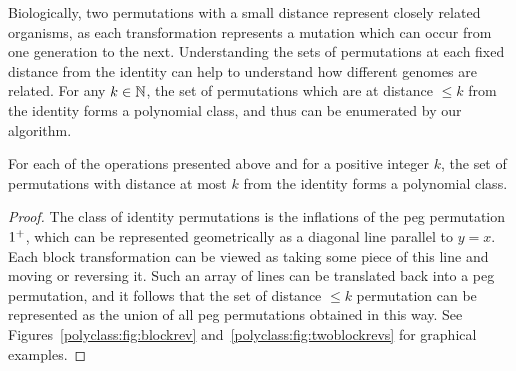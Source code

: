     Biologically, two permutations with a small distance represent closely
    related organisms, as each transformation represents a mutation which can
    occur from one generation to the next. Understanding the sets of
    permutations at each fixed distance from the identity can help to
    understand how different genomes are related. For any $k \in \mathbb{N}$, the
    set of permutations which are at distance $\leq k$ from the identity forms
    a polynomial class, and thus can be enumerated by our algorithm. 

    \begin{theorem} \label{polyclass:def:operation-polyclass}
      For each of the operations presented above and for a positive integer
      $k$, the set of permutations with distance at most $k$ from the identity
      forms a polynomial class. 
    \end{theorem}
    \begin{proof}
      The class of identity permutations is the inflations of the peg
      permutation $1^+$, which can be represented geometrically as a diagonal
      line parallel to $y =x $. Each block transformation can be viewed as
      taking some piece of this line and moving or reversing it. Such an array
      of lines can be translated back into a peg permutation, and it follows
      that the set of distance $\leq k$ permutation can be represented as the
      union of all peg permutations obtained in this way.  See
      Figures~\ref{polyclass:fig:blockrev} and~\ref{polyclass:fig:twoblockrevs}
      for graphical examples. 
    \end{proof}


